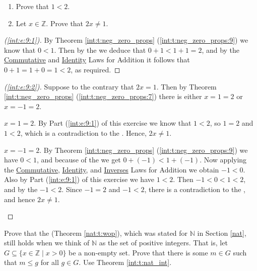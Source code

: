 \Newpage
\begin{exercise} %
	\hfill
	\begin{enumerate}
		\item \label{int:e:9:1}
		      Prove that $1 < 2$.
		\item \label{int:e:9:2}
		      Let $x \in \mathbb{Z}$. Prove that $2 x \neq 1$.
	\end{enumerate}
\end{exercise}

\begin{proof}[(\ref{int:e:9:1})]
	By Theorem \ref{int:t:neg_zero_props} (\ref{int:t:neg_zero_props:9}) we know that $0 < 1$. Then by the  we deduce that $0 + 1 < 1 + 1 = 2$, and by the \hyperref[int:t:props:commutative_add]{Commutative} and \hyperref[int:t:props:identity_add]{Identity} Laws for Addition it follows that $0 + 1 = 1 + 0 = 1 < 2$, as required.
\end{proof}

\begin{proof}[(\ref{int:e:9:2})]
	Suppose to the contrary that $2x = 1$. Then by Theorem \ref{int:t:neg_zero_props} (\ref{int:t:neg_zero_props:7}) there is either $x = 1 = 2$ or $x = -1 = 2$.
	\begin{bycases}
		\item $x = 1 = 2$. By Part (\ref{int:e:9:1}) of this exercise we know that $1 < 2$, so $1 = 2$ and $1 < 2$, which is a contradiction to the . Hence, $2x \not= 1$.
		\item $x = -1 = 2$. By Theorem \ref{int:t:neg_zero_props} (\ref{int:t:neg_zero_props:9}) we have $0 < 1$, and because of the  we get $0 + (-1) < 1 + (-1)$. Now applying the \hyperref[int:t:props:commutative_add]{Commutative}, \hyperref[int:t:props:identity_add]{Identity}, and \hyperref[int:t:props:inverses_add]{Inverses} Laws for Addition we obtain $-1 < 0$. Also by Part (\ref{int:e:9:1}) of this exercise we have $1 < 2$. Then $-1 < 0 < 1 < 2$, and by the  $-1 < 2$. Since $-1 = 2$ and $-1 < 2$, there is a contradiction to the , and hence $2x \not= 1$.
	\end{bycases}
\end{proof}


\Newpage
\begin{exercise} %
	Prove that the  (Theorem \ref{nat:t:wop}), which was stated for $\mathbb{N}$ in Section \ref{nat}, still holds when we think of $\mathbb{N}$ as the set of positive integers. That is, let $G \subseteq \{ x \in \mathbb{Z} \mid x > 0 \}$ be a non-empty set. Prove that there is some $m \in G$ such that $m \leq g$ for all $g \in G$. Use Theorem \ref{int:t:nat_int}.
\end{exercise}

